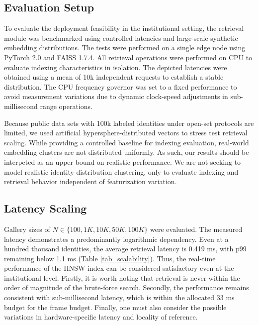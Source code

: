 \documentclass[conference]{IEEEtran}
\begin{document}
\subsection{Evaluation Setup}
To evaluate the deployment feasibility in the institutional setting, the retrieval module was benchmarked using controlled latencies and large-scale synthetic embedding distributions. The tests were performed on a single edge node using PyTorch 2.0 and FAISS 1.7.4. All retrieval operations were performed on CPU to evaluate indexing characteristics in isolation. The depicted latencies were obtained using a mean of 10k independent requests to establish a stable distribution. The CPU frequency governor was set to a fixed performance to avoid measurement variations due to dynamic clock-speed adjustments in sub-millisecond range operations.

Because public data sets with 100k labeled identities under open-set protocols are limited, we used artificial hypersphere-distributed vectors to stress test retrieval scaling. While providing a controlled baseline for indexing evaluation, real-world embedding clusters are not distributed uniformly. As such, our results should be interpeted as an upper bound on realistic performance. We are not seeking to model realistic identity distribution clustering, only to evaluate indexing and retrieval behavior independent of featurization variation.

\subsection{Latency Scaling}
Gallery sizes of $N \in \{100, 1K, 10K, 50K, 100K\}$ were evaluated. The measured latency demonstrates a predominantly logarithmic dependency. Even at a hundred thousand identities, the average retrieval latency is 0.419 ms, with p99 remaining below 1.1 ms (Table \ref{tab_scalability}). Thus, the real-time performance of the HNSW index can be considered satisfactory even at the institutional level. Firstly, it is worth noting that retrieval is never within the order of magnitude of the brute-force search. Secondly, the performance remains consistent with sub-millisecond latency, which is within the allocated 33 ms budget for the frame budget. Finally, one must also consider the possible variations in hardware-specific latency and locality of reference.
\end{document}
